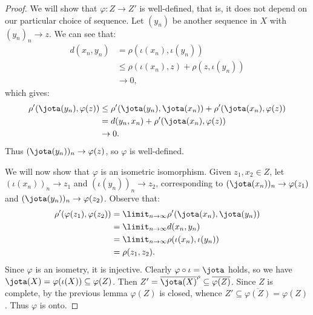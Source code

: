 \begin{theorem}
\begin{proof}
                We will show that $\varphi:Z \rightarrow Z'$ is well-defined, that is, it does not depend on our particular choice of sequence. Let $(y_n)$ be another sequence in $X$ with $(y_n)_n \rightarrow z$. We can see that:
                    \begin{equation*}
                    \begin{split}
                        d(x_n,y_n) 
                        & = \rho(\iota(x_n),\iota(y_n)) \\
                        & \leq \rho(\iota(x_n), z) + \rho(z, \iota(y_n)) \\
                        & \rightarrow 0,
                    \end{split}
                    \end{equation*}
                which gives:
                    \begin{equation*}
                    \begin{split}
                        \rho'(\jota(y_n), \varphi(z))
                        & \leq \rho'(\jota(y_n),\jota(x_n)) + \rho'(\jota(x_n),\varphi(z)) \\
                        & = d(y_n,x_n) + \rho'(\jota(x_n),\varphi(z)) \\
                        & \rightarrow 0.
                    \end{split}
                    \end{equation*}
                Thus $(\jota(y_n))_n \rightarrow \varphi(z)$, so $\varphi$ is well-defined.

                We will now show that $\varphi$ is an isometric isomorphism. Given $z_1,x_2 \in Z$, let $(\iota(x_n))_n \rightarrow z_1$ and $(\iota(y_n))_n \rightarrow z_2$, corresponding to $(\jota(x_n))_n \rightarrow \varphi(z_1)$ and $(\jota(y_n))_n \rightarrow \varphi(z_2)$. Observe that:
                    \begin{equation*}
                    \begin{split}
                        \rho'(\varphi(z_1),\varphi(z_2))
                        & = \limit_{n \rightarrow \infty} \rho'(\jota(x_n),\jota(y_n)) \\
                        & = \limit_{n \rightarrow \infty}d(x_n,y_n) \\
                        & = \limit_{n \rightarrow \infty}\rho(\iota(x_n),\iota(y_n)) \\
                        & = \rho(z_1,z_2).
                    \end{split}
                    \end{equation*}
                Since $\varphi$ is an isometry, it is injective. Clearly $\varphi \circ \iota = \jota$ holds, so we have $\jota(X) = \varphi(\iota(X)) \subseteq \varphi(Z)$. Then $Z' = \overline{\jota(X)}^\rho \subseteq \overline{\varphi(Z)}$. Since $Z$ is complete, by the previous lemma $\varphi(Z)$ is closed, whence $Z' \subseteq \overline{\varphi(Z)} = \varphi(Z)$. Thus $\varphi$ is onto.


\end{proof}
\end{theorem}
